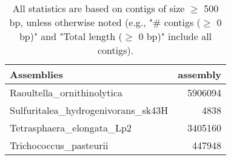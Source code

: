 \documentclass[12pt,a4paper]{article}
\begin{document}
\begin{table}[ht]
\begin{center}
\caption{All statistics are based on contigs of size $\geq$ 500 bp, unless otherwise noted (e.g., "\# contigs ($\geq$ 0 bp)" and "Total length ($\geq$ 0 bp)" include all contigs).}
\begin{tabular}{|l*{1}{|r}|}
\hline
Assemblies & assembly \\ \hline
Raoultella\_ornithinolytica & 5906094 \\ \hline
Sulfuritalea\_hydrogenivorans\_sk43H & 4838 \\ \hline
Tetrasphaera\_elongata\_Lp2 & 3405160 \\ \hline
Trichococcus\_pasteurii & 447948 \\ \hline
\end{tabular}
\end{center}
\end{table}
\end{document}
